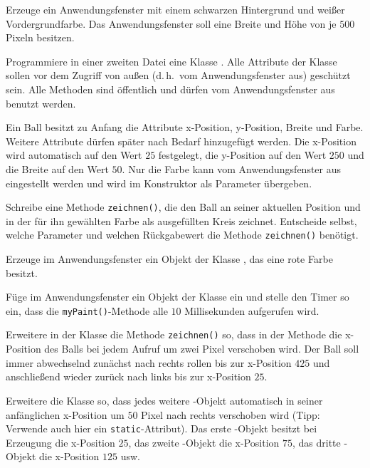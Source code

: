 \begin{compactenum}[a)]

\item Erzeuge ein Anwendungsfenster mit einem schwarzen Hintergrund und weißer
Vordergrundfarbe. Das Anwendungsfenster soll eine Breite und Höhe von je $500$
Pixeln besitzen.

\item Programmiere in einer zweiten Datei eine Klasse . Alle
Attribute der Klasse  sollen vor dem Zugriff von außen (d.\,h.\
vom Anwendungsfenster aus) geschützt sein. Alle Methoden sind öffentlich und
dürfen vom Anwendungsfenster aus benutzt werden.

\item Ein Ball besitzt zu Anfang die Attribute x-Position, y-Position, Breite
und Farbe. Weitere Attribute dürfen später nach Bedarf hinzugefügt werden. Die
x-Position wird automatisch auf den Wert $25$ festgelegt, die y-Position auf
den Wert $250$ und die Breite auf den Wert $50$. Nur die Farbe kann vom
Anwendungsfenster aus eingestellt werden und wird im Konstruktor als Parameter
übergeben.

Schreibe eine Methode \lstinline|zeichnen()|, die den Ball an seiner aktuellen
Position und in der für ihn gewählten Farbe als ausgefüllten Kreis zeichnet.
Entscheide selbst, welche Parameter und welchen Rückgabewert die Methode
\lstinline|zeichnen()| benötigt.

\item Erzeuge im Anwendungsfenster ein Objekt der Klasse , das
eine rote Farbe besitzt.

\item Füge im Anwendungsfenster ein Objekt der Klasse  ein und
stelle den Timer so ein, dass die \lstinline|myPaint()|-Methode alle $10$
Millisekunden aufgerufen wird.

\item Erweitere in der Klasse  die Methode \lstinline|zeichnen()|
so, dass in der Methode die x-Position des Balls bei jedem Aufruf um zwei Pixel
verschoben wird. Der Ball soll immer abwechselnd zunächst nach rechts rollen
bis zur x-Position $425$ und anschließend wieder zurück nach links bis zur
x-Position $25$.

\item Erweitere die Klasse  so, dass jedes weitere
\myClass{Ball}-Objekt automatisch in seiner anfänglichen x-Position um $50$
Pixel nach rechts verschoben wird (Tipp: Verwende auch hier ein
\lstinline|static|-Attribut). Das erste -Objekt besitzt bei
Erzeugung die x-Position $25$, das zweite -Objekt die x-Position
$75$, das dritte \myClass{Ball}-Objekt die x-Position $125$ usw.


\end{compactenum}
